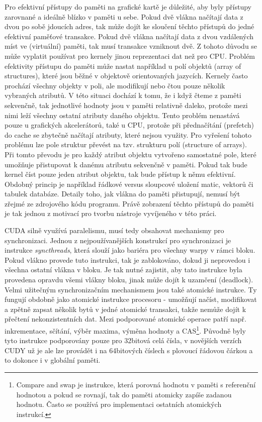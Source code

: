 Pro efektivní přístupy do paměti na grafické kartě je důležité, aby byly přístupy zarovnané a ideálně blízko v paměti u sebe. Pokud dvě vlákna načítají data z dvou po sobě jdoucích adres, tak může dojít ke sloučení těchto přístupů do jedné efektivní paměťové transakce. Pokud dvě vlákna načítají data z dvou vzdálených míst ve (virtuální) paměti, tak musí transakce vzniknout dvě. Z tohoto důvodu se může vyplatit používat pro kernely jinou reprezentaci dat než pro CPU. Problém efektivity přístupu do paměti může nastat například u polí objektů (array of structures), které jsou běžné v objektově orientovaných jazycích. Kernely často prochází všechny objekty v poli, ale modifikují nebo čtou pouze několik vybraných atributů. V této situaci dochází k tomu, že i když čteme z paměti sekvenčně, tak jednotlivé hodnoty jsou v paměti relativně daleko, protože mezi nimi leží všechny ostatní atributy daného objektu. Tento problém nenastává pouze u grafických akcelerátorů, také u CPU, protože při přednačítání (prefetch) do cache se zbytečně načítají atributy, které nejsou využity. Pro vyřešení tohoto problému lze pole struktur převést na tzv. strukturu polí (structure of arrays). Při tomto převodu je pro každý atribut objektu vytvořeno samostatné pole, které umožňuje přistupovat k danému atributu sekvenčně v paměti. Pokud tak bude kernel číst pouze jeden atribut objektu, tak bude přístup k němu efektivní. Obdobný princip je například řádkové versus sloupcové uložení matic, vektorů či tabulek databáze. Detaily toho, jak vlákna do paměti přistupují, nemusí být zřejmé ze zdrojového kódu programu. Právě zobrazení těchto přístupů do paměti je tak jednou z motivací pro tvorbu nástroje vyvíjeného v této práci.

CUDA silně využívá paralelismu, musí tedy obsahovat mechanismy pro synchronizaci. Jednou z nejpoužívanějších konstrukcí pro synchronizaci je instrukce \emph{syncthreads}, která slouží jako bariéra pro všechny warpy v rámci bloku. Pokud vlákno provede tuto instrukci, tak je zablokováno, dokud ji neprovedou i všechna ostatní vlákna v bloku. Je tak nutné zajistit, aby tato instrukce byla provedena opravdu všemi vlákny bloku, jinak může dojít k uzamčení (deadlock). Velmi užitečným synchronizačním mechanismem jsou také atomické instrukce. Ty fungují obdobně jako atomické instrukce procesoru - umožňují načíst, modifikovat a zpětně zapsat několik bytů v jedné atomické transakci, takže nemůže dojít k přečtení nekonzistentních dat. Mezi podporované atomické operace patří např. inkrementace, sčítání, výběr maxima, výměna hodnoty a CAS\footnote{Compare and swap je instrukce, která porovná hodnotu v paměti s referenční hodnotou a pokud se rovnají, tak do paměti atomicky zapíše zadanou hodnotu. Často se používá pro implementaci ostatních atomických instrukcí.}. Původně byly tyto instrukce podporovány pouze pro 32bitová celá čísla, v novějších verzích CUDY už je ale lze provádět i na 64bitových číslech s plovoucí řádovou čárkou a to dokonce i v globální paměti.

